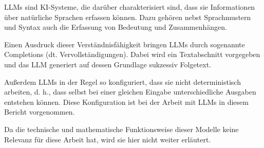 \documentclass[../main.tex]{subfiles}
\begin{document}
\glspl{LLM} sind KI-Systeme, die darüber charakterisiert sind, dass sie Informationen über natürliche Sprachen erfassen können.
Dazu gehören nebst Sprachmustern und Syntax auch die Erfassung von Bedeutung und Zusammenhängen.
\cite{zheng2023large}

Einen Ausdruck dieser Verständnisfähigkeit bringen \glspl{LLM} durch sogenannte Completions (dt. Vervollständigungen).
Dabei wird ein Textabschnitt vorgegeben und das \gls{LLM} generiert auf dessen Grundlage sukzessiv Folgetext.
\cite{naveed2023comprehensive}

Außerdem \glspl{LLM} in der Regel so konfiguriert, dass sie nicht deterministisch arbeiten, d. h., dass selbst bei einer gleichen Eingabe unterschiedliche Ausgaben entstehen können.
Diese Konfiguration ist bei der Arbeit mit \glspl{LLM} in diesem Bericht vorgenommen.

Da die technische und mathematische Funktionsweise dieser Modelle keine Relevanz für diese Arbeit hat, wird sie hier nicht weiter erläutert.
\end{document}

